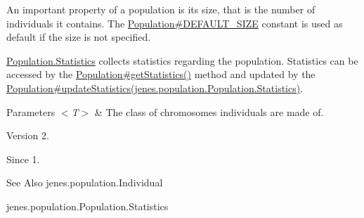 An important property of a population is its size, that is the number of individuals it contains. The \hyperlink{}{Population\#\-D\-E\-F\-A\-U\-L\-T\-\_\-\-S\-I\-Z\-E} constant is used as default if the size is not specified. 

\hyperlink{}{Population.\-Statistics} collects statistics regarding the population. Statistics can be accessed by the \hyperlink{}{Population\#get\-Statistics()} method and updated by the \hyperlink{}{Population\#update\-Statistics(jenes.\-population.\-Population.\-Statistics)}.


\begin{DoxyParams}{Parameters}
{\em $<$\-T$>$} & The class of chromosomes individuals are made of.\\
\hline
\end{DoxyParams}
\begin{DoxyVersion}{Version}
2. 
\end{DoxyVersion}
\begin{DoxySince}{Since}
1.
\end{DoxySince}
\begin{DoxySeeAlso}{See Also}
jenes.\-population.\-Individual 

jenes.\-population.\-Population.\-Statistics 
\end{DoxySeeAlso}



